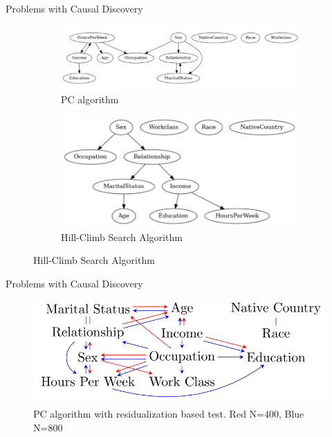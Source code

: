 \documentclass{beamer}
\begin{document}
\begin{frame}{Problems with Causal Discovery}
	\begin{figure}
		\centering
		\begin{subfigure}{\textwidth}
			\centering
			\includegraphics[scale=0.25]{imgs/pdag_pc.png}
			\caption{PC algorithm}
		\end{subfigure}
		\begin{subfigure}{\textwidth}
			\centering
			\includegraphics[scale=0.25]{imgs/pdag_hill.png}
			\caption{Hill-Climb Search Algorithm}
		\end{subfigure}
	\end{figure}
\end{frame}

\begin{frame}{Problems with Causal Discovery}
	\begin{figure}
		\centering
		\includegraphics[scale=0.3]{imgs/pc_sample.png}
		\caption{PC algorithm with residualization based test. Red N=400, Blue N=800}
	\end{figure}
\end{frame}
\end{document}
